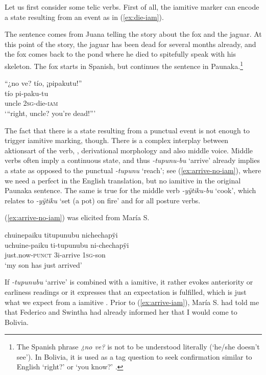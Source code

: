 Let us first consider some telic verbs. First of all, the iamitive marker can encode a state resulting from an event as in (\ref{ex:die-iam}).

The sentence comes from Juana telling the story about the fox and the jaguar. At this point of the story, the jaguar has been dead for several months already, and the fox comes back to the pond where he died to spitefully speak with his skeleton. The fox starts in Spanish, but continues the sentence in Paunaka.\footnote{The Spanish phrase \textit{¿no ve?} is not to be understood literally (‘he/she doesn’t see’). In Bolivia, it is used as a tag question to seek confirmation similar to English ‘right?’ or ‘you know?’ \citep[45]{Mendoza2015}.}

\ea\label{ex:die-iam}
\begingl
\glpreamble “¿no ve? tío, ¡pipakutu!”\\
 tío pi-paku-tu\\
 uncle 2\textsc{sg}-die-\textsc{iam}\\
\glft ‘“right, uncle? you’re dead!”’
\endgl
\trailingcitation{[jmx-n120429ls-x5.286-287]}
\xe

The fact that there is a state resulting from a punctual event is not enough to trigger iamitive marking, though. There is a complex interplay between aktionsart of the verb, , derivational morphology and also middle voice. Middle verbs often imply a continuous state, and thus \textit{-tupunu-bu} ‘arrive’ already implies a  state as opposed to the punctual \textit{-tupunu} ‘reach’; see (\ref{ex:arrive-no-iam}), where we need a perfect in the English translation, but no iamitive in the original Paunaka sentence. The same is true for the middle verb \textit{-yÿtiku-bu} ‘cook’, which relates to \textit{-yÿtiku} ‘set (a pot) on fire’ and for all posture verbs.

(\ref{ex:arrive-no-iam}) was elicited from María S.

\ea\label{ex:arrive-no-iam}
\begingl
\glpreamble chuinepaiku titupunubu nichechapÿi\\
\gla uchuine-paiku ti-tupunubu ni-chechapÿi\\
\glb just.now-\textsc{punct} 3i-arrive 1\textsc{sg}-son \\
\glft ‘my son has just arrived’
\endgl
\trailingcitation{[rxx-e181022le.124]}
\xe
{}

If \textit{-tupunubu} ‘arrive’ is combined with a iamitive, it rather evokes anteriority or earliness readings or it expresses that an expectation is fulfilled, which is just what we expect from a iamitive \citep[cf.][21]{Olsson2013}. Prior to (\ref{ex:arrive-iam}), María S. had told me that Federico and Swintha had already informed her that I would come to Bolivia.

